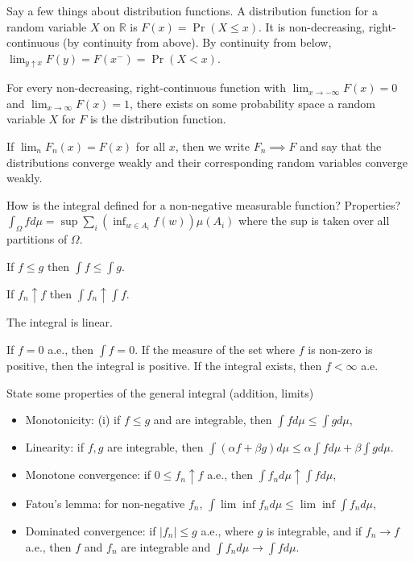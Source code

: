 \documentclass[avery5388,grid,frame]{flashcards}
\newcommand{\R}{\mathbb{R}}
\begin{document}
\begin{flashcard}
    {Say a few things about distribution functions.}
    A distribution function for a random variable $X$ on $\R$ is $F(x) = \Pr(X \leq x)$. It is non-decreasing, right-continuous (by continuity from above). By continuity from below, $\lim_{y \uparrow x} F(y) = F(x^-) = \Pr(X < x)$.

    For every non-decreasing, right-continuous function with $\lim_{x \rightarrow -\infty} F(x) = 0$ and $\lim_{x \rightarrow \infty} F(x) = 1$, there exists on some probability space a random variable $X$ for $F$ is the distribution function.

    If $\lim_n F_n(x) = F(x)$ for all $x$, then we write $F_n \implies F$ and say that the distributions converge weakly and their corresponding random variables converge weakly.
\end{flashcard}


\begin{flashcard}
    {How is the integral defined for a non-negative measurable function? Properties?}
    $\int_\Omega f d\mu = \sup \sum_i (\inf_{w \in A_i} f(w)) \mu(A_i)$ where the sup is taken over all partitions of $\Omega$.

    If $f \leq g$ then $\int f \leq \int g$.

    If $f_n \uparrow f$ then $\int f_n \uparrow \int f$.

    The integral is linear.

    If $f = 0$ a.e., then $\int f = 0$. If the measure of the set where $f$ is non-zero is positive, then the integral is positive. If the integral exists, then $f < \infty$ a.e.
\end{flashcard}


\begin{flashcard}
    {State some properties of the general integral (addition, limits)}
    \begin{itemize}
        \item Monotonicity: (i) if $f \leq g$ and are integrable, then $\int f d\mu \leq \int g d\mu$,
        \item Linearity: if $f,g$ are integrable, then $\int (\alpha f + \beta g) d\mu \leq \alpha \int f d\mu + \beta \int g d\mu$.
        \item Monotone convergence: if $0 \leq f_n \uparrow f$ a.e., then $\int f_n d\mu \uparrow \int f d\mu$,
        \item Fatou's lemma: for non-negative $f_n$, $\int \lim \inf f_n d\mu \leq \lim \inf \int f_n d\mu$,
        \item Dominated convergence: if $|f_n| \leq g$ a.e., where $g$ is integrable, and if $f_n \rightarrow f$ a.e., then $f$ and $f_n$ are integrable and $\int f_n d\mu \rightarrow \int f d\mu$.
    \end{itemize}
\end{flashcard}
\end{document}
